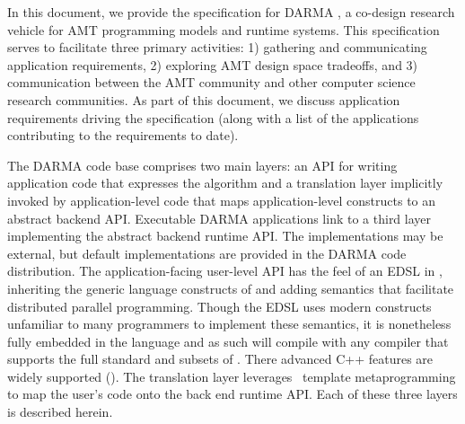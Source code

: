 
In this document, we provide the specification for DARMA 
,
a co-design research vehicle for \gls{AMT} programming models and runtime
systems.  This specification serves to facilitate three primary activities: 
1) gathering and communicating application requirements, 2) exploring AMT
design space tradeoffs, and 3) communication between the AMT community and
other computer science research communities.
As part of this document, we discuss application requirements driving the specification (along
with a list of the applications contributing to the requirements to date).

The DARMA code base comprises two main layers: 
an API for writing application code that expresses the algorithm and  
a translation layer implicitly invoked by application-level code that maps application-level constructs
to an abstract backend API.
Executable DARMA applications link to a third layer implementing the abstract backend runtime API.
The implementations may be external, but default implementations are provided in the DARMA code distribution.
The application-facing user-level \gls{API} has the feel of an \gls{EDSL} in \CC,  
inheriting the generic language constructs of \CC and adding \gls{semantics} that facilitate
distributed parallel programming.  
Though the \gls{EDSL} uses modern \CC constructs unfamiliar to many programmers to implement these semantics, 
it is nonetheless fully embedded in the \CC language and as such will compile with any
\CC compiler that supports the full  standard and subsets of .
There advanced C++ features are widely supported ().  
The \gls{translation layer} leverages \CC\ \gls{template
metaprogramming} to map the user's code onto the \gls{back end} runtime \gls{API}.
Each of these three layers is described herein.


